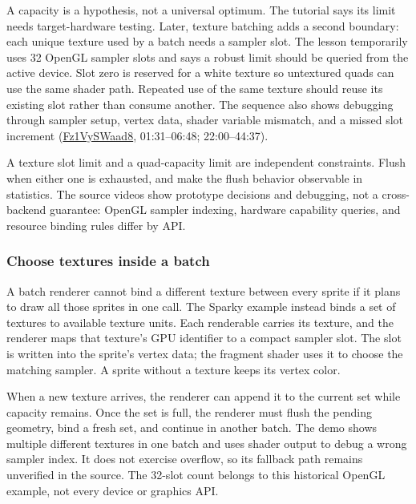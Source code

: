 A capacity is a hypothesis, not a universal optimum. The tutorial says its limit needs target-hardware testing. Later, texture batching adds a second boundary: each unique texture used by a batch needs a sampler slot. The lesson temporarily uses 32 OpenGL sampler slots and says a robust limit should be queried from the active device. Slot zero is reserved for a white texture so untextured quads can use the same shader path. Repeated use of the same texture should reuse its existing slot rather than consume another. The sequence also shows debugging through sampler setup, vertex data, shader variable mismatch, and a missed slot increment (\href{https://www.youtube.com/watch?v=Fz1VySWaad8}{Fz1VySWaad8}, 01:31--06:48; 22:00--44:37).

A texture slot limit and a quad-capacity limit are independent constraints. Flush when either one is exhausted, and make the flush behavior observable in statistics. The source videos show prototype decisions and debugging, not a cross-backend guarantee: OpenGL sampler indexing, hardware capability queries, and resource binding rules differ by API.

\subsubsection{Choose textures inside a batch}\label{06-engine-ii-ch026-choose-textures-inside-a-batch}

\hypertarget{06-engine-ii-ch026-choose-textures-inside-a-batch}{}

A batch renderer cannot bind a different texture between every sprite if it plans to draw all those sprites in one call. The Sparky example instead binds a set of textures to available texture units. Each renderable carries its texture, and the renderer maps that texture's GPU identifier to a compact sampler slot. The slot is written into the sprite's vertex data; the fragment shader uses it to choose the matching sampler. A sprite without a texture keeps its vertex color.

When a new texture arrives, the renderer can append it to the current set while capacity remains. Once the set is full, the renderer must flush the pending geometry, bind a fresh set, and continue in another batch. The demo shows multiple different textures in one batch and uses shader output to debug a wrong sampler index. It does not exercise overflow, so its fallback path remains unverified in the source. The 32-slot count belongs to this historical OpenGL example, not every device or graphics API.

